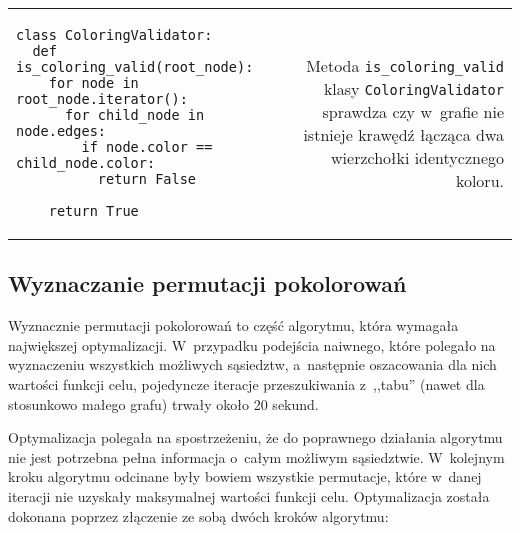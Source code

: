 \documentclass[a4paper,10pt]{article}
\begin{document}
\noindent\begin{table}[ht!]
            \begin{tabular}{lr}
                \begin{minipage}[t]{0.55\textwidth}
                    \begin{verbatim}
class ColoringValidator:
  def is_coloring_valid(root_node):
    for node in root_node.iterator():
      for child_node in node.edges:
        if node.color == child_node.color:
          return False

    return True
                    \end{verbatim}
                \end{minipage}
                
                &
        
                \begin{minipage}[t]{0.45\textwidth}
                    \noindent Metoda \verb+is_coloring_valid+ klasy \verb+ColoringValidator+ sprawdza czy w~grafie nie istnieje krawędź łącząca dwa wierzchołki identycznego koloru.
                \end{minipage}
            
                \\
            
            \end{tabular}
        
        \end{table}
        
\subsection*{Wyznaczanie permutacji pokolorowań}

Wyznacznie permutacji pokolorowań to część algorytmu, która wymagała największej optymalizacji. W~przypadku podejścia naiwnego, które polegało na wyznaczeniu wszystkich możliwych sąsiedztw, a~następnie oszacowania dla nich wartości funkcji celu, pojedyncze iteracje przeszukiwania z~,,tabu'' (nawet dla stosunkowo małego grafu) trwały około 20 sekund.

Optymalizacja polegała na spostrzeżeniu, że do poprawnego działania algorytmu nie jest potrzebna pełna informacja o~całym możliwym sąsiedztwie. W~kolejnym kroku algorytmu odcinane były bowiem wszystkie permutacje, które w~danej iteracji nie uzyskały maksymalnej wartości funkcji celu. Optymalizacja została dokonana poprzez złączenie ze sobą dwóch kroków algorytmu:
\end{document}
